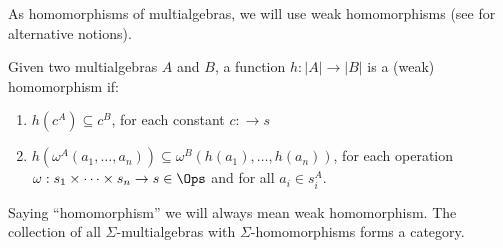 As homomorphisms of multialgebras, we will use weak homomorphisms (see
\cite{catrel} for alternative notions).
\begin{definition}Given two multialgebras $A$ and $B$, 
a function $h: |A| \to |B|$ is a (weak) homomorphism if:
\begin{enumerate}\MyLPar
\item $h(c^A) \subseteq c^B$, for each constant $c: \to s$ 
\item $h(\omega^A(a_1 , \ldots , a_n)) \subseteq\omega^B(h(a_1), \ldots ,h(a_n))$,
for each operation  $\omega:s_1\times\cdots\times s_n\to s\in\Ops$ and for all $a_i \in s_{i}^A$.
\end{enumerate}
\end{definition}
Saying ``homomorphism'' we will always mean weak homomorphism.
The collection of all $\Sigma$-multialgebras with $\Sigma$-homomorphisms
forms a category. 

